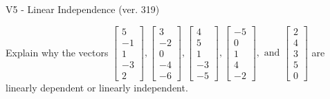 \begin{exercise}
  \begin{exerciseTitle}V5 - Linear Independence (ver. 319)\end{exerciseTitle}
  \begin{exerciseStatement}
    Explain why the vectors \(\left[\begin{array}{r}
5 \\
-1 \\
1 \\
-3 \\
2
\end{array}\right] , \left[\begin{array}{r}
3 \\
-2 \\
0 \\
-4 \\
-6
\end{array}\right] , \left[\begin{array}{r}
4 \\
5 \\
1 \\
-3 \\
-5
\end{array}\right] , \left[\begin{array}{r}
-5 \\
0 \\
1 \\
4 \\
-2
\end{array}\right] , \text{ and } \left[\begin{array}{r}
2 \\
4 \\
3 \\
5 \\
0
\end{array}\right]\) are linearly dependent or linearly independent.	



\end{exerciseStatement}
\end{exercise}
